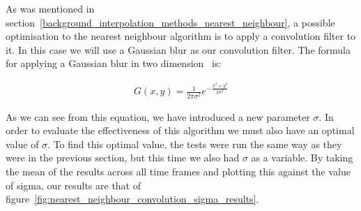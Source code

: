 			As was mentioned in section~\ref{background_interpolation_methods_nearest_neighbour}, a possible optimisation to the nearest neighbour algorithm is to apply a convolution filter to it. In this case we will use a Gaussian blur as our convolution filter. The formula for applying a Gaussian blur in two dimension~\cite{gaussianblur} is:

			\begin{align*}
				G(x,y) = \frac{1}{2\pi\sigma^{2}} e^{-\frac{x^{2} + y^{2}}{2\sigma^{2}}}
			\end{align*}

			As we can see from this equation, we have introduced a new parameter $\sigma$. In order to evaluate the effectiveness of this algorithm we must also have an optimal value of $\sigma$. To find this optimal value, the tests were run the same way as they were in the previous section, but this time we also had $\sigma$ as a variable. By taking the mean of the results across all time frames and plotting this against the value of sigma, our results are that of figure~\ref{fig:nearest_neighbour_convolution_sigma_results}. 

